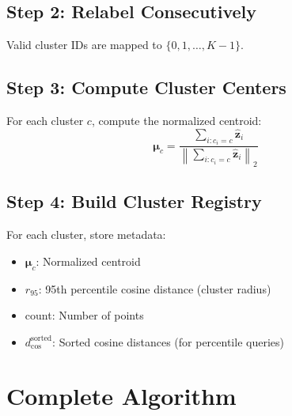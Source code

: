 \documentclass[11pt,a4paper]{article}
\newcommand{\vect}[1]{\mathbf{#1}}
\begin{document}
\subsection{Step 2: Relabel Consecutively}

Valid cluster IDs are mapped to $\{0, 1, \ldots, K-1\}$.

\subsection{Step 3: Compute Cluster Centers}

For each cluster $c$, compute the normalized centroid:
\begin{equation}
    \boldsymbol{\mu}_c = \frac{\sum_{i: c_i = c} \hat{\vect{z}}_i}{\left\|\sum_{i: c_i = c} \hat{\vect{z}}_i\right\|_2}
\end{equation}

\subsection{Step 4: Build Cluster Registry}

For each cluster, store metadata:
\begin{itemize}
    \item $\boldsymbol{\mu}_c$: Normalized centroid
    \item $r_{95}$: 95th percentile cosine distance (cluster radius)
    \item count: Number of points
    \item $d_{\cos}^{\text{sorted}}$: Sorted cosine distances (for percentile queries)
\end{itemize}

\section{Complete Algorithm}
\end{document}
